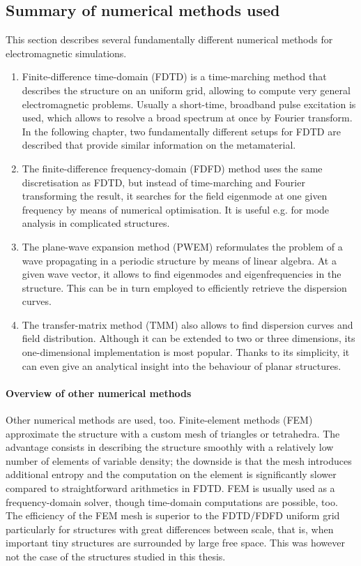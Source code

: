 \subsection{Summary of numerical methods used} %
This section describes several fundamentally different numerical methods for electromagnetic simulations. 
\begin{enumerate}
\item{Finite-difference time-domain (FDTD) is a time-marching method that describes the structure on an uniform grid, allowing to compute very general electromagnetic problems. Usually a short-time, broadband pulse excitation is used, which allows to resolve a broad spectrum at once by Fourier transform. In the following chapter, two fundamentally different setups for FDTD are described that provide similar information on the metamaterial.} 
\item{The finite-difference frequency-domain (FDFD) method uses the same discretisation as FDTD, but instead of time-marching and Fourier transforming the result, it searches for the field eigenmode at one given frequency by means of numerical optimisation. It is useful e.g. for mode analysis in complicated structures.} 
\item{The plane-wave expansion method (PWEM) reformulates the problem of a wave propagating in a periodic structure by means of linear algebra. At a given wave vector, it allows to find eigenmodes and eigenfrequencies in the structure. This can be in turn employed to efficiently retrieve the dispersion curves.} 
\item{The transfer-matrix method (TMM) also allows to find dispersion curves and field distribution. Although it can be extended to two or three dimensions, its one-dimensional implementation is most popular. Thanks to its simplicity, it can even give an analytical insight into the behaviour of planar structures.} 
\end{enumerate}

\paragraph{Overview of other numerical methods} %
Other numerical methods are used, too. Finite-element methods (FEM) approximate the structure with a custom mesh of triangles or tetrahedra. The advantage consists in describing the structure smoothly with a relatively low number of elements of variable density; the downside is that the mesh introduces additional entropy and the computation on the element is significantly slower compared to straightforward arithmetics in FDTD. FEM is usually used as a frequency-domain solver, though time-domain computations are possible, too. The efficiency of the FEM mesh is superior to the FDTD/FDFD uniform grid particularly for structures with great differences between scale, that is, when important tiny structures are surrounded by large free space. This was however not the case of the structures studied in this thesis.


